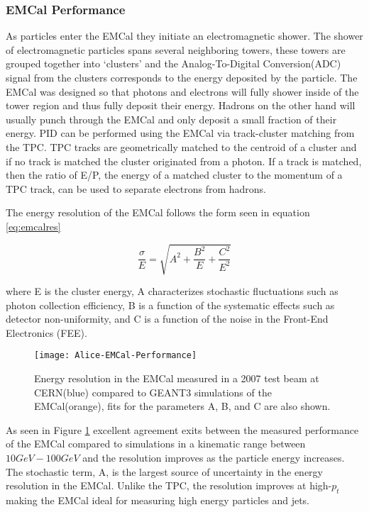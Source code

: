 \subsubsection{EMCal Performance}
As particles enter the EMCal they initiate an electromagnetic shower.  The shower of electromagnetic particles spans several neighboring towers, these towers are grouped together into `clusters' and the Analog-To-Digital Conversion(ADC) signal from the clusters corresponds to the energy deposited by the particle.  The EMCal was designed so that photons and electrons will fully shower inside of the tower region and thus fully deposit their energy.  Hadrons on the other hand will usually punch through the EMCal and only deposit a small fraction of their energy.  PID can be performed using the EMCal via track-cluster matching from the TPC.  TPC tracks are geometrically matched to the centroid of a cluster and if no track is matched the cluster originated from a photon. If a track is matched, then the ratio of E/P, the energy of a matched cluster to the momentum of a TPC track, can be used to separate electrons from hadrons.

The energy resolution of the EMCal follows the form seen in equation \ref{eq:emcalres}



\begin{equation}
\frac{\sigma}{E} = \sqrt{ A^{2} + \frac{B^{2}}{E} + \frac{C^{2}}{E^{2}}  }
\label{eq:emcalres}
\end{equation}

\noindent
where E is the cluster energy, A characterizes stochastic fluctuations such as photon collection efficiency, B is a function of the systematic effects such as detector non-uniformity, and C is a function of the noise in the Front-End Electronics (FEE). 

\begin{figure}[h]
\texttt{[image: Alice-EMCal-Performance]}
\centering
\caption{Energy resolution in the EMCal measured in a 2007 test beam at CERN(blue) compared to GEANT3 simulations of the EMCal(orange), fits for the parameters A, B, and C are also shown\cite{Abeysekara:2010ze}.}
\label{fig:EMCalres}
\end{figure}

\noindent
As seen in Figure \ref{fig:EMCalres} excellent agreement exits between the measured performance of the EMCal compared to simulations in a kinematic range between $10 GeV - 100 GeV$ and the resolution improves as the particle energy increases.  The stochastic term, A, is the largest source of uncertainty in the energy resolution in the EMCal.  Unlike the TPC, the resolution improves at high-$p_{t}$ making the EMCal ideal for measuring high energy particles and jets.


